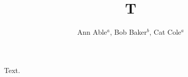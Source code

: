 \documentclass[sigconf]{acmart}
\begin{document}
\title{T}
\author{Ann Able${}^a$, Bob Baker${}^b$, Cat Cole${}^a$}
\maketitle
Text.
\end{document}
